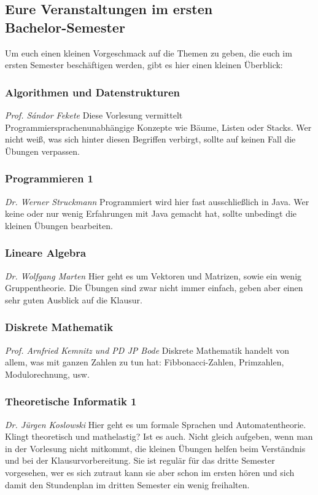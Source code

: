 \begin{multicols}{2}
\subsection{Eure Veranstaltungen im ersten \\ Bachelor-Semester}
	Um euch einen kleinen Vorgeschmack auf die Themen zu geben, die euch im ersten Semester beschäftigen werden, gibt es hier einen kleinen Überblick:

\subsubsection{Algorithmen und Datenstrukturen}
	\textit{Prof. S\'andor Fekete}
	Diese Vorlesung vermittelt Programmiersprachenunabhängige Konzepte wie Bäume, Listen oder Stacks. Wer nicht weiß, was sich hinter diesen Begriffen verbirgt, sollte auf keinen Fall die Übungen verpassen.

\subsubsection{Programmieren 1}
	\textit{Dr. Werner Struckmann}
	Programmiert wird hier fast ausschließlich in Java. Wer keine oder nur wenig Erfahrungen mit Java gemacht hat, sollte unbedingt die kleinen Übungen bearbeiten.

\subsubsection{Lineare Algebra}
	\textit{Dr. Wolfgang Marten}
	Hier geht es um Vektoren und Matrizen, sowie ein wenig Gruppentheorie. Die Übungen sind zwar nicht immer einfach, geben aber einen sehr guten Ausblick auf die Klausur.


\subsubsection{Diskrete Mathematik}
	\textit{Prof. Arnfried Kemnitz und PD JP Bode}
	Diskrete Mathematik handelt von allem, was mit ganzen Zahlen zu tun hat: Fibbonacci-Zahlen, Primzahlen, Modulorechnung, usw. 
\subsubsection{Theoretische Informatik 1}
	\textit{Dr. Jürgen Koslowski}
	Hier geht es um formale Sprachen und Automatentheorie.
	Klingt theoretisch und mathelastig? Ist es auch. Nicht gleich
	aufgeben, wenn man in der Vorlesung nicht mitkommt, die kleinen
	Übungen helfen beim Verständnis und bei der Klausurvorbereitung.
	Sie ist regulär für das dritte Semester vorgesehen, wer es sich
	zutraut kann sie aber schon im ersten hören und sich damit den
	Stundenplan im dritten Semester ein wenig freihalten. 
\end{multicols}
